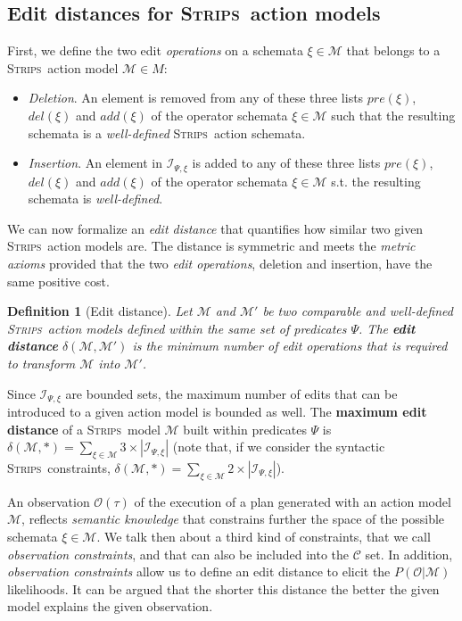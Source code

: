 \documentclass[letterpaper]{article} %
\newcommand{\strips}{\textsc{Strips}}     %
\newtheorem{definition}[theorem]{Definition}
\begin{document}
\subsection{Edit distances for \strips\ action models}
First, we define the two edit \emph{operations} on a schemata $\xi\in\mathcal{M}$ that belongs to a \strips\ action model $\mathcal{M}\in M$:
\begin{itemize}
\item {\em Deletion}. An element is removed from any of these three lists $pre(\xi)$, $del(\xi)$ and $add(\xi)$ of the operator schemata $\xi\in\mathcal{M}$ such that the resulting schemata is a {\em well-defined} \strips\ action schemata.
\item {\em Insertion}. An element in ${\mathcal I}_{\Psi,\xi}$ is added to any of these three lists $pre(\xi)$, $del(\xi)$ and $add(\xi)$ of the operator schemata $\xi\in\mathcal{M}$ s.t. the resulting schemata is {\em well-defined}.
\end{itemize}

We can now formalize an {\em edit distance} that quantifies how similar two given \strips\ action models are. The distance is symmetric and meets the {\em metric axioms} provided that the two {\em edit operations}, deletion and insertion, have the same positive cost.

\begin{definition}[Edit distance]
  Let $\mathcal{M}$ and $\mathcal{M}'$ be two {\em comparable} and {\em well-defined} \strips\ action models defined within the same set of predicates $\Psi$. The {\bf edit distance} $\delta(\mathcal{M},\mathcal{M}')$ is the minimum number of {\em edit operations} that is required to transform $\mathcal{M}$ into $\mathcal{M}'$.
\end{definition}

Since ${\mathcal I}_{\Psi,\xi}$ are bounded sets, the maximum number of edits that can be introduced to a given action model is bounded as well. The \textbf{maximum edit distance} of a \strips\ model $\mathcal{M}$ built within predicates $\Psi$ is $\delta(\mathcal{M},*)=\sum_{\xi\in\mathcal{M}} 3\times|{\mathcal I}_{\Psi,\xi}|$ (note that, if we consider the syntactic \strips\ constraints, $\delta(\mathcal{M},*)=\sum_{\xi\in\mathcal{M}} 2\times|{\mathcal I}_{\Psi,\xi}|$).

An observation $\mathcal{O}(\tau)$ of the execution of a plan generated with an action model $\mathcal{M}$, reflects {\em semantic knowledge} that constrains further the space of the possible schemata $\xi\in \mathcal{M}$. We talk then about a third kind of constraints, that we call {\em observation constraints}, and that can also be included into the $\mathcal{C}$ set. In addition, {\em observation constraints} allow us to define an edit distance to elicit the $P(\mathcal{O}|\mathcal{M})$ likelihoods. It can be argued that the shorter this  distance the better the given model explains the given observation.
\end{document}

